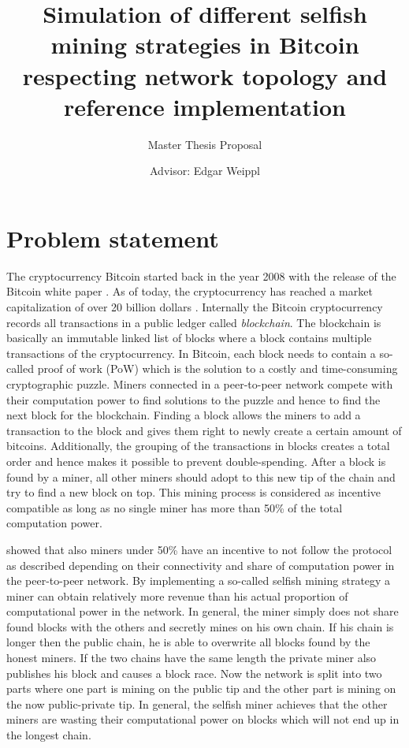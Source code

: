 \documentclass{scrartcl}
\title{Simulation of different selfish mining strategies in Bitcoin respecting network topology and reference implementation}
\subtitle{Master Thesis Proposal}
\author{Advisor: Edgar Weippl}
\begin{document}
\maketitle

\section{Problem statement}
The cryptocurrency Bitcoin started back in the year 2008 with the release of the Bitcoin white paper \cite{nakamoto2008bitcoin}.
As of today, the cryptocurrency has reached a market capitalization of over 20 billion dollars \cite{marketcap2017}.
Internally the Bitcoin cryptocurrency records all transactions in a public ledger called \emph{blockchain}.
The blockchain is basically an immutable linked list of blocks where a block contains multiple transactions of the cryptocurrency.
In Bitcoin, each block needs to contain a so-called proof of work (PoW) which is the solution to a costly and time-consuming cryptographic puzzle.
Miners connected in a peer-to-peer network compete with their computation power to find solutions to the puzzle and hence to find the next block for the blockchain.
Finding a block allows the miners to add a transaction to the block and gives them right to newly create a certain amount of bitcoins.
Additionally, the grouping of the transactions in blocks creates a total order and hence makes it possible to prevent double-spending.
After a block is found by a miner, all other miners should adopt to this new tip of the chain and try to find a new block on top.
This mining process is considered as incentive compatible as long as no single miner has more than 50\% of the total computation power.

\citeauthor{eyal2014majority} showed that also miners under 50\% have an incentive to not follow the protocol as described depending on their connectivity and share of computation power in the peer-to-peer network.
By implementing a so-called selfish mining strategy a miner can obtain relatively more revenue than his actual proportion of computational power in the network.
In general, the miner simply does not share found blocks with the others and secretly mines on his own chain.
If his chain is longer then the public chain, he is able to overwrite all blocks found by the honest miners.
If the two chains have the same length the private miner also publishes his block and causes a block race.
Now the network is split into two parts where one part is mining on the public tip and the other part is mining on the now public-private tip.
In general, the selfish miner achieves that the other miners are wasting their computational power on blocks which will not end up in the longest chain.
\end{document}
